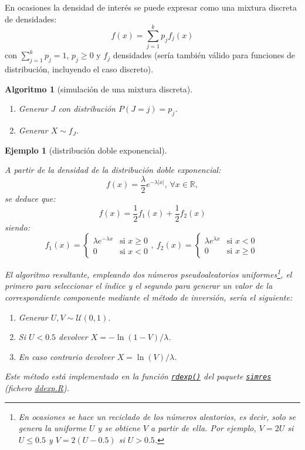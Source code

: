 \documentclass[
  spanish,
  10pt,
]{book}
\theoremstyle{break}
\newtheorem{conjecture}{Algoritmo}[chapter]
\newtheorem{example}{Ejemplo}[chapter]
\theoremstyle{nonumberplain}
\let\oldfootnote\footnote
\renewcommand\footnote[1]{\oldfootnote{\hspace{2mm}#1}}
\begin{document}
En ocasiones la densidad de interés se puede expresar como una mixtura discreta de densidades:
\[f(x)=\sum_{j=1}^{k}p_{j}f_{j}(x)\]
con \(\sum_{j=1}^{k}p_j=1\), \(p_j\geq 0\) y \(f_j\) densidades (sería también válido para funciones de distribución, incluyendo el caso discreto).

\begin{conjecture}[simulación de una mixtura discreta]
\protect\hypertarget{cnj:mixtura-discreta}{}\label{cnj:mixtura-discreta}

\begin{enumerate}
\def\labelenumi{\arabic{enumi}.}
\item
  Generar \(J\) con distribución \(P\left( J=j \right) = p_j\).
\item
  Generar \(X\sim f_J\).
\end{enumerate}

\end{conjecture}

\begin{example}[distribución doble exponencial]
\protect\hypertarget{exm:dexp-mix}{}\label{exm:dexp-mix}

A partir de la densidad de la distribución doble exponencial:
\[f(x) =\frac{\lambda }{2}e^{-\lambda \left\vert x\right\vert } \text{, }\forall x\in \mathbb{R},\]
se deduce que:
\[f(x) = \frac{1}{2}f_{1}(x) + \frac{1}{2}f_{2}(x)\]
siendo:
\[f_{1}(x) = \left\{ 
\begin{array}{ll}
\lambda e^{-\lambda x} & \text{si } x\geq 0 \\ 
0 & \text{si } x<0
\end{array}
\right., \  
f_{2}(x) = \left\{ 
\begin{array}{ll}
\lambda e^{\lambda x} & \text{si } x<0 \\ 
0 & \text{si } x\geq 0
\end{array}
\ \right.\]

El algoritmo resultante, empleando dos números pseudoaleatorios uniformes\footnote{En ocasiones se hace un reciclado de los números aleatorios, es decir, solo se genera la uniforme \(U\) y se obtiene \(V\) a partir de ella. Por ejemplo, \(V=2U\) si \(U \le 0.5\) y \(V=2(U-0.5)\) si \(U > 0.5\).}, el primero para seleccionar el índice y el segundo para generar un valor de la correspondiente componente mediante el método de inversión, sería el siguiente:

\begin{enumerate}
\def\labelenumi{\arabic{enumi}.}
\item
  Generar \(U,V \sim \mathcal{U}(0, 1)\).
\item
  Si \(U<0.5\) devolver \(X= -\ln( 1-V )/\lambda\).
\item
  En caso contrario devolver \(X= \ln(V)/\lambda\).
\end{enumerate}

Este método está implementado en la función \href{https://rubenfcasal.github.io/simres/reference/ddexp.html}{\texttt{rdexp()}} del paquete \href{https://rubenfcasal.github.io/simres}{\texttt{simres}} (fichero \href{R/ddexp.R}{\emph{ddexp.R}}).
\end{example}
\end{document}
